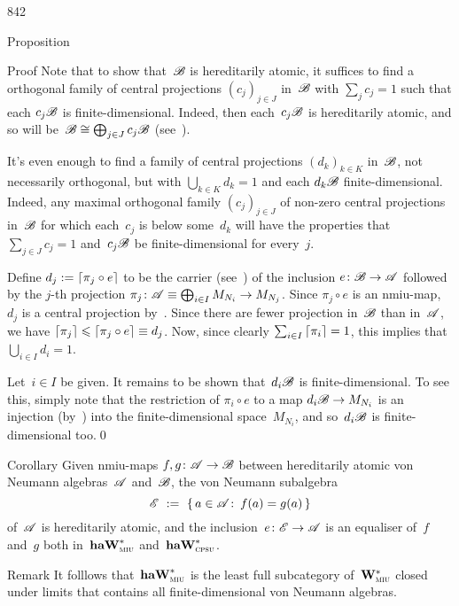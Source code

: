\begin{parsec}{842}
\begin{point}{30}{Proposition}
\begin{point}{40}{Proof}
Note that to show that~$\mathscr{B}$ is hereditarily atomic,
it suffices to find a orthogonal family of central
projections $(c_j)_{j\in J}$ in~$\mathscr{B}$
with $\sum_j c_j=1$ 
such that  each $c_j\mathscr{B}$ is finite-dimensional.
Indeed, then each~$c_j\mathscr{B}$ is hereditarily atomic,
and so will be~$\mathscr{B}\cong \bigoplus_{j\in J} c_j\mathscr{B}$
(see~).

It's even enough to find a family of central projections
$(d_k)_{k\in K}$ in~$\mathscr{B}$,
not necessarily orthogonal, but
with $\bigcup_{k\in K} d_k =1$
and each $d_k\mathscr{B}$  finite-dimensional.
Indeed, any maximal orthogonal 
family $(c_j)_{j\in J}$
of non-zero central projections in~$\mathscr{B}$
for which each~$c_j$ is below some~$d_k$
will have the properties
that $\sum_{j\in J} c_j =1$
and~$c_j\mathscr{B}$ be finite-dimensional for every~$j$.

Define $d_j := \left\lceil\pi_j\circ e\right\rceil$
to be the carrier (see~)
of the inclusion $e\colon \mathscr{B}\to\mathscr{A}$
followed by the $j$-th projection
$\pi_j\colon \mathscr{A}\equiv\bigoplus_{i\in I}M_{N_i}\to M_{N_j}$.
Since $\pi_j\circ e$ is an nmiu-map,
    $d_j$ is a central projection by~.
Since there are fewer projection in~$\mathscr{B}$ than in~$\mathscr{A}$,
we have $\left\lceil\pi_j\right\rceil\leqslant \left\lceil\pi_j\circ e\right\rceil\equiv d_j$.
Now, since clearly $\sum_{i\in I}\left\lceil\pi_i\right\rceil=1$,
this implies that $\bigcup_{i\in I} d_i =1$.

Let~$i\in I$ be given.
It remains to be shown that~$d_i\mathscr{B}$ is finite-dimensional.
To see this, simply note that the restriction
of $\pi_i\circ e$ to a map $d_i\mathscr{B} \to M_{N_i}$
    is an injection (by~)
    into the finite-dimensional space~$M_{N_i}$,
    and so~$d_i\mathscr{B}$ is finite-dimensional too.\qed
\end{point}
\end{point}
\begin{point}{50}{Corollary}%
Given nmiu-maps
$f,g\colon \mathscr{A}\to\mathscr{B}$
between hereditarily atomic
von Neumann algebras~$\mathscr{A}$ and~$\mathscr{B}$,
the von Neumann subalgebra
\begin{equation*}
    \mathscr{E} \ :=\  \{\,a\in\mathscr{A}\colon\, f(a)=g(a)\,\}
\end{equation*}
of~$\mathscr{A}$
is hereditarily atomic,
and the inclusion~$e\colon \mathscr{E}\to\mathscr{A}$
is an equaliser of~$f$ and~$g$ both in~$\mathbf{haW}^*_{\text{\textsc{miu}}}$
and~$\mathbf{haW}^*_{\text{\textsc{cpsu}}}$.
\end{point}
\begin{point}{60}{Remark}%
It folllows that~$\mathbf{haW}^*_{\text{\textsc{miu}}}$
is the least full subcategory of~$\mathbf{W}^*_{\text{\textsc{miu}}}$
closed under limits
that contains all finite-dimensional von Neumann algebras.
\end{point}
\end{parsec}
